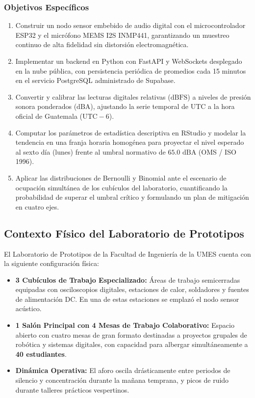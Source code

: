 \documentclass{article}
\begin{document}
\subsubsection{Objetivos Específicos}
\begin{enumerate}
    \item Construir un nodo sensor embebido de audio digital con el microcontrolador ESP32 y el micrófono MEMS I2S INMP441, garantizando un muestreo continuo de alta fidelidad sin distorsión electromagnética.
    \item Implementar un backend en Python con FastAPI y WebSockets desplegado en la nube pública, con persistencia periódica de promedios cada 15 minutos en el servicio PostgreSQL administrado de Supabase.
    \item Convertir y calibrar las lecturas digitales relativas ($\text{dBFS}$) a niveles de presión sonora ponderados ($\text{dBA}$), ajustando la serie temporal de UTC a la hora oficial de Guatemala ($\text{UTC}-6$).
    \item Computar los parámetros de estadística descriptiva en RStudio y modelar la tendencia en una franja horaria homogénea para proyectar el nivel esperado al sexto día (lunes) frente al umbral normativo de $65.0\text{ dBA}$ (OMS / ISO 1996).
    \item Aplicar las distribuciones de Bernoulli y Binomial ante el escenario de ocupación simultánea de los cubículos del laboratorio, cuantificando la probabilidad de superar el umbral crítico y formulando un plan de mitigación en cuatro ejes.
\end{enumerate}

\subsection{Contexto Físico del Laboratorio de Prototipos}
El Laboratorio de Prototipos de la Facultad de Ingeniería de la UMES cuenta con la siguiente configuración física:
\begin{itemize}
    \item \textbf{3 Cubículos de Trabajo Especializado:} Áreas de trabajo semicerradas equipadas con osciloscopios digitales, estaciones de calor, soldadores y fuentes de alimentación DC. En una de estas estaciones se emplazó el nodo sensor acústico.
    \item \textbf{1 Salón Principal con 4 Mesas de Trabajo Colaborativo:} Espacio abierto con cuatro mesas de gran formato destinadas a proyectos grupales de robótica y sistemas digitales, con capacidad para albergar simultáneamente a \textbf{40 estudiantes}.
    \item \textbf{Dinámica Operativa:} El aforo oscila drásticamente entre periodos de silencio y concentración durante la mañana temprana, y picos de ruido durante talleres prácticos vespertinos.
\end{itemize}
\end{document}
